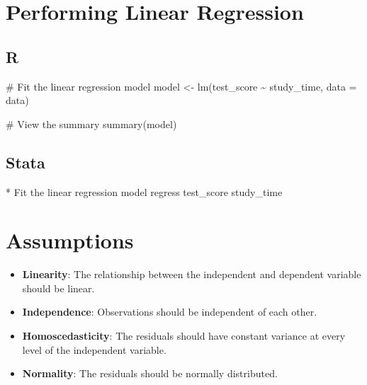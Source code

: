 \documentclass[
  letterpaper,
  DIV=11,
  numbers=noendperiod]{scrreprt}
\newenvironment{Shaded}{\begin{snugshade}}{\end{snugshade}}
\newcommand{\AttributeTok}[1]{\textcolor[rgb]{0.40,0.45,0.13}{#1}}
\newcommand{\CommentTok}[1]{\textcolor[rgb]{0.37,0.37,0.37}{#1}}
\newcommand{\FunctionTok}[1]{\textcolor[rgb]{0.28,0.35,0.67}{#1}}
\newcommand{\KeywordTok}[1]{\textcolor[rgb]{0.00,0.23,0.31}{#1}}
\newcommand{\NormalTok}[1]{\textcolor[rgb]{0.00,0.23,0.31}{#1}}
\newcommand{\OtherTok}[1]{\textcolor[rgb]{0.00,0.23,0.31}{#1}}
\newcommand{\SpecialCharTok}[1]{\textcolor[rgb]{0.37,0.37,0.37}{#1}}
\providecommand{\tightlist}{%
  \setlength{\itemsep}{0pt}\setlength{\parskip}{0pt}}\usepackage{longtable,booktabs,array}
\begin{document}
\section{Performing Linear
Regression}\label{performing-linear-regression}

\subsection{R}\label{r-1}

\begin{Shaded}
\begin{Highlighting}[]
\CommentTok{\# Fit the linear regression model}
\NormalTok{model }\OtherTok{\textless{}{-}} \FunctionTok{lm}\NormalTok{(test\_score }\SpecialCharTok{\textasciitilde{}}\NormalTok{ study\_time, }\AttributeTok{data =}\NormalTok{ data)}

\CommentTok{\# View the summary}
\FunctionTok{summary}\NormalTok{(model)}
\end{Highlighting}
\end{Shaded}

\subsection{Stata}\label{stata-1}

\begin{Shaded}
\begin{Highlighting}[]
\NormalTok{* Fit the linear regression }\KeywordTok{model}
\KeywordTok{regress}\NormalTok{ test\_score study\_time}
\end{Highlighting}
\end{Shaded}

\section{Assumptions}\label{assumptions-1}

\begin{itemize}
\tightlist
\item
  \textbf{Linearity}: The relationship between the independent and
  dependent variable should be linear.
\item
  \textbf{Independence}: Observations should be independent of each
  other.
\item
  \textbf{Homoscedasticity}: The residuals should have constant variance
  at every level of the independent variable.
\item
  \textbf{Normality}: The residuals should be normally distributed.
\end{itemize}
\end{document}
